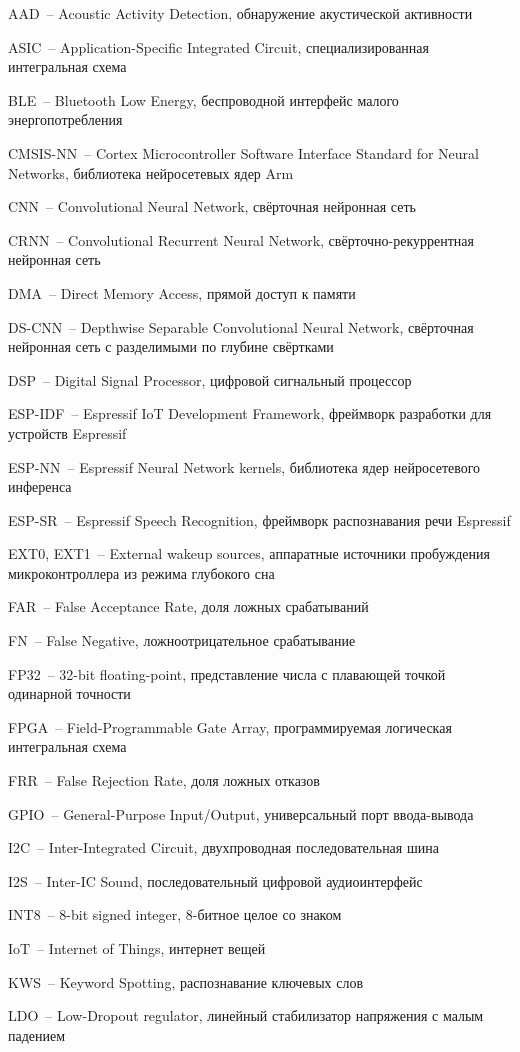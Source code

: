 
\begingroup
\setlength{\parindent}{0pt}
\setlength{\parskip}{0pt}
\newcommand{\abbr}[2]{%
	\noindent #1~-- #2\par
	\vspace{0.3em}
}

\abbr{AAD}{Acoustic Activity Detection, обнаружение акустической активности}
\abbr{ASIC}{Application-Specific Integrated Circuit, специализированная интегральная схема}
\abbr{BLE}{Bluetooth Low Energy, беспроводной интерфейс малого энергопотребления}
\abbr{CMSIS-NN}{Cortex Microcontroller Software Interface Standard for Neural Networks, библиотека нейросетевых ядер Arm}
\abbr{CNN}{Convolutional Neural Network, свёрточная нейронная сеть}
\abbr{CRNN}{Convolutional Recurrent Neural Network, свёрточно-рекуррентная нейронная сеть}
\abbr{DMA}{Direct Memory Access, прямой доступ к памяти}
\abbr{DS-CNN}{Depthwise Separable Convolutional Neural Network, свёрточная нейронная сеть с разделимыми по глубине свёртками}
\abbr{DSP}{Digital Signal Processor, цифровой сигнальный процессор}
\abbr{ESP-IDF}{Espressif IoT Development Framework, фреймворк разработки для устройств Espressif}
\abbr{ESP-NN}{Espressif Neural Network kernels, библиотека ядер нейросетевого инференса}
\abbr{ESP-SR}{Espressif Speech Recognition, фреймворк распознавания речи Espressif}
\abbr{EXT0, EXT1}{External wakeup sources, аппаратные источники пробуждения микроконтроллера из режима глубокого сна}
\abbr{FAR}{False Acceptance Rate, доля ложных срабатываний}
\abbr{FN}{False Negative, ложноотрицательное срабатывание}
\abbr{FP32}{32-bit floating-point, представление числа с плавающей точкой одинарной точности}
\abbr{FPGA}{Field-Programmable Gate Array, программируемая логическая интегральная схема}
\abbr{FRR}{False Rejection Rate, доля ложных отказов}
\abbr{GPIO}{General-Purpose Input/Output, универсальный порт ввода-вывода}
\abbr{I2C}{Inter-Integrated Circuit, двухпроводная последовательная шина}
\abbr{I2S}{Inter-IC Sound, последовательный цифровой аудиоинтерфейс}
\abbr{INT8}{8-bit signed integer, 8-битное целое со знаком}
\abbr{IoT}{Internet of Things, интернет вещей}
\abbr{KWS}{Keyword Spotting, распознавание ключевых слов}
\abbr{LDO}{Low-Dropout regulator, линейный стабилизатор напряжения с малым падением}
